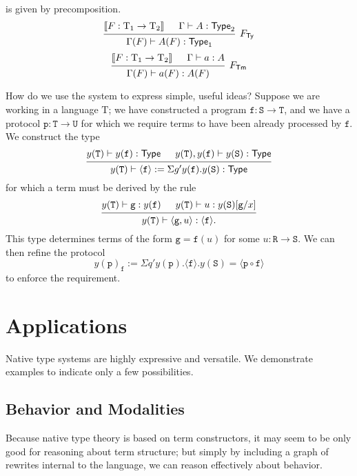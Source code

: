 \documentclass[12pt]{article}
\theoremstyle{definition}
\newcommand{\define}[1]{{\bf \boldmath{#1}}}
\newcommand{\msf}[1]{\mathsf{#1}}
\newcommand{\mrm}[1]{\mathrm{#1}}
\newcommand{\mtt}[1]{\mathtt{#1}}
\newcommand{\T}{\mrm{T}}
\newcommand{\Type}{\msf{Type}}
\newcommand{\tts}{\mtt{S}}
\newcommand{\ttt}{\mtt{T}}
\newcommand{\ttu}{\mtt{U}}
\newcommand{\ttf}{\mtt{f}}
\newcommand{\ttg}{\mtt{g}}
\newcommand{\interp}[1]{\llbracket #1 \rrbracket}
\newcommand{\p}{\mtt{p}}
\begin{document}
\define{Translation} is given by precomposition.
\[\begin{prooftree}
    \hypo{\interp{F:\T_1\to \T_2}}
    \hypo{\Gamma\vdash A:\Type_2}
    \infer2[$F_\msf{Ty}$]{\Gamma(F)\vdash A(F):\Type_1}
\end{prooftree}\]
\[\begin{prooftree}
    \hypo{\interp{F:\T_1\to \T_2}}
    \hypo{\Gamma\vdash a:A}
    \infer2[$F_\msf{Tm}$]{\Gamma(F)\vdash a(F):A(F)}
\end{prooftree}\]

How do we use the system to express simple, useful ideas? Suppose we are working in a language $\T$; we have constructed a program $\ttf:\tts\to \ttt$, and we have a protocol $\mtt{p}:\ttt\to \ttu$ for which we require terms to have been already processed by $\ttf$. We construct the type
\[\begin{prooftree}
    \hypo{y(\ttt)\vdash y(\ttf):\Type}
    \hypo{y(\ttt),y(\ttf)\vdash y(\tts):\Type}
    \infer2[]{y(\ttt)\vdash \langle \ttf\rangle:= \Sigma g'y(\ttf).y(\tts):\Type}
\end{prooftree}\]
for which a term must be derived by the rule
\[\begin{prooftree}
    \hypo{y(\ttt)\vdash \ttg:y(\ttf)}
    \hypo{y(\ttt)\vdash u:y(\tts)[\ttg/x]}
    \infer2[]{y(\ttt)\vdash \langle \ttg,u\rangle:\langle \ttf\rangle.}
\end{prooftree}\]
This type determines terms of the form $\ttg=\ttf(u)$ for some $u:\mtt{R}\to \tts$. We can then refine the protocol
\[y(\p)_\ttf:=\Sigma q'y(\p).\langle \ttf\rangle.y(\tts) = \langle\p\circ \ttf\rangle\] 
to enforce the requirement.



\section{Applications}
\label{sec:apply}

Native type systems are highly expressive and versatile.  We demonstrate examples to indicate only a few possibilities.

\subsection{Behavior and Modalities}
\label{ssec:behavior}

Because native type theory is based on term constructors, it may seem to be only good for reasoning about term structure; but simply by including a graph of rewrites internal to the language, we can reason effectively about behavior.
\end{document}
